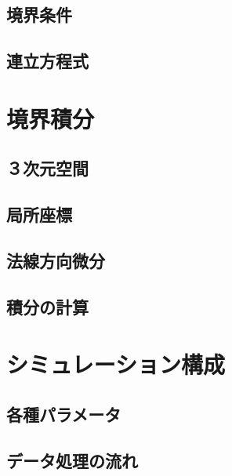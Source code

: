 \subsection{境界条件}

\subsection{連立方程式}



\section{境界積分}

\subsection{３次元空間}

\subsection{局所座標}

\subsection{法線方向微分}

\subsection{積分の計算}


\section{シミュレーション構成}

\subsection{各種パラメータ}

\subsection{データ処理の流れ}
